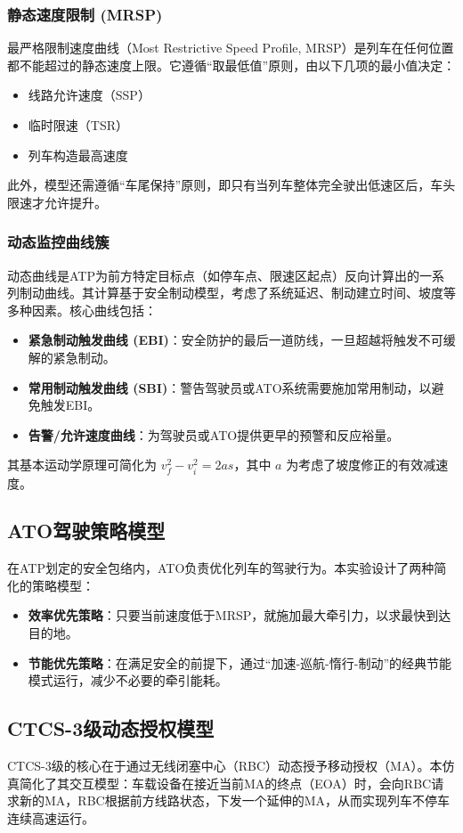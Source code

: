 \documentclass[11pt, a4paper]{ctexart}
\begin{document}
\subsubsection{静态速度限制 (MRSP)}
最严格限制速度曲线（Most Restrictive Speed Profile, MRSP）是列车在任何位置都不能超过的静态速度上限。它遵循“取最低值”原则，由以下几项的最小值决定：
\begin{itemize}
    \item 线路允许速度（SSP）
    \item 临时限速（TSR）
    \item 列车构造最高速度
\end{itemize}
此外，模型还需遵循“车尾保持”原则，即只有当列车整体完全驶出低速区后，车头限速才允许提升。

\subsubsection{动态监控曲线簇}
动态曲线是ATP为前方特定目标点（如停车点、限速区起点）反向计算出的一系列制动曲线。其计算基于安全制动模型，考虑了系统延迟、制动建立时间、坡度等多种因素。核心曲线包括：
\begin{itemize}
    \item \textbf{紧急制动触发曲线 (EBI)}：安全防护的最后一道防线，一旦超越将触发不可缓解的紧急制动。
    \item \textbf{常用制动触发曲线 (SBI)}：警告驾驶员或ATO系统需要施加常用制动，以避免触发EBI。
    \item \textbf{告警/允许速度曲线}：为驾驶员或ATO提供更早的预警和反应裕量。
\end{itemize}
其基本运动学原理可简化为 $v_f^2 - v_i^2 = 2as$，其中 $a$ 为考虑了坡度修正的有效减速度。

\subsection{ATO驾驶策略模型}
在ATP划定的安全包络内，ATO负责优化列车的驾驶行为。本实验设计了两种简化的策略模型：
\begin{itemize}
    \item \textbf{效率优先策略}：只要当前速度低于MRSP，就施加最大牵引力，以求最快到达目的地。
    \item \textbf{节能优先策略}：在满足安全的前提下，通过“加速-巡航-惰行-制动”的经典节能模式运行，减少不必要的牵引能耗。
\end{itemize}

\subsection{CTCS-3级动态授权模型}
CTCS-3级的核心在于通过无线闭塞中心（RBC）动态授予移动授权（MA）。本仿真简化了其交互模型：车载设备在接近当前MA的终点（EOA）时，会向RBC请求新的MA，RBC根据前方线路状态，下发一个延伸的MA，从而实现列车不停车连续高速运行。
\end{document}
